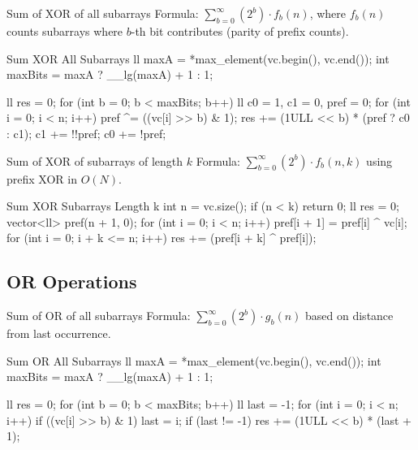 \documentclass[10pt]{article}
\newcommand{\complexity}[1]{%
  \tcbox[on line,
    colback=tagbg,
    colframe=tagbg,
    boxrule=0pt,
    arc=2pt,
    boxsep=0pt,
    left=3.5pt, right=3.5pt, top=1.5pt, bottom=1.5pt
  ]{\color{tagtext}\scriptsize\bfseries\ensuremath{#1}}%
}
\begin{document}
\begin{conceptbox}{Sum of XOR of all subarrays}
    Formula: $\sum_{b = 0}^{\infty} (2^b) \cdot f_b(n)$, where $f_b(n)$ counts subarrays where $b$-th bit contributes (parity of prefix counts).
\end{conceptbox}

\begin{vscode}{Sum XOR All Subarrays \complexity{O(N \log(\max A))}}
ll maxA = *max_element(vc.begin(), vc.end());
int maxBits = maxA ? __lg(maxA) + 1 : 1;

ll res = 0;
for (int b = 0; b < maxBits; b++) 
{
    ll c0 = 1, c1 = 0, pref = 0;
    for (int i = 0; i < n; i++) 
    {
        pref ^= ((vc[i] >> b) & 1);
        res += (1ULL << b) * (pref ? c0 : c1);
        c1 += !!pref; 
        c0 += !pref;
    }
}
\end{vscode}

\begin{conceptbox}{Sum of XOR of subarrays of length $k$}
    Formula: $\sum_{b = 0}^{\infty} (2^b) \cdot f_b(n, k)$ using prefix XOR in $O(N)$.
\end{conceptbox}

\begin{vscode}{Sum XOR Subarrays Length k \complexity{O(N)}}
int n = vc.size();
if (n < k) 
    return 0;
ll res = 0;
vector<ll> pref(n + 1, 0);
for (int i = 0; i < n; i++) 
    pref[i + 1] = pref[i] ^ vc[i];
for (int i = 0; i + k <= n; i++)
    res += (pref[i + k] ^ pref[i]);
\end{vscode}

\newpage
\subsection{OR Operations}

\begin{conceptbox}{Sum of OR of all subarrays}
    Formula: $\sum_{b = 0}^{\infty} (2^b) \cdot g_b(n)$ based on distance from last occurrence.
\end{conceptbox}

\begin{vscode}{Sum OR All Subarrays \complexity{O(N \log(\max A))}}
ll maxA = *max_element(vc.begin(), vc.end());
int maxBits = maxA ? __lg(maxA) + 1 : 1;

ll res = 0;
for (int b = 0; b < maxBits; b++) 
{
    ll last = -1;
    for (int i = 0; i < n; i++) 
    {
        if ((vc[i] >> b) & 1) 
            last = i;
        if (last != -1) 
            res += (1ULL << b) * (last + 1);
    }
}
\end{vscode}
\end{document}
